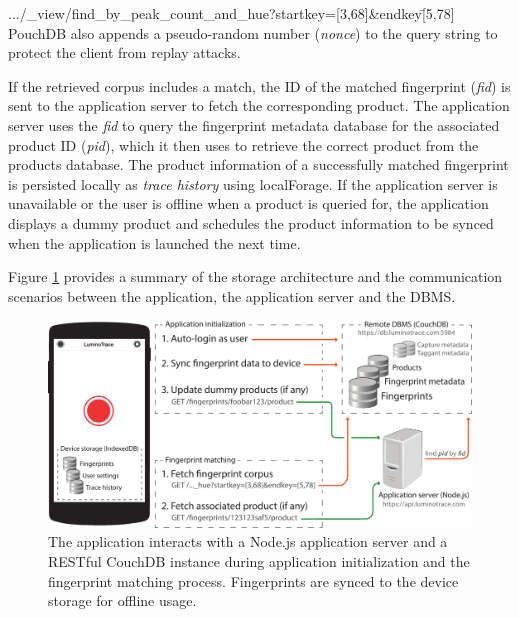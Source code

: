 \documentclass[thesis.tex]{subfiles}
\begin{document}
\colorbox{gray!10} {\quad \small .../\_view/find\_by\_peak\_count\_and\_hue?startkey=[3,68]\&endkey\=[5,78] \quad} \\


\noindent PouchDB also appends a pseudo-random number (\emph{nonce}) to the query string to protect the client from replay attacks.

If the retrieved corpus includes a match, the ID of the matched fingerprint (\emph{fid}) is sent to the application server to fetch the corresponding product. The application server uses the \emph{fid} to query the fingerprint metadata database for the associated product ID (\emph{pid}), which it then uses to retrieve the correct product from the products database. The product information of a successfully matched fingerprint is persisted locally as \emph{trace history} using localForage. If the application server is unavailable or the user is offline when a product is queried for, the application displays a dummy product and schedules the product information to be synced when the application is launched the next time.

Figure \ref{figure:application-database-flow} provides a summary of the storage architecture and the communication scenarios between the application, the application server and the DBMS.

\enlargethispage{10\baselineskip}

\begin{figure}[h]
\centering \includegraphics[width=\textwidth,height=\textheight,keepaspectratio=true]{images/design_implementation/application_database_flow}
\caption{The application interacts with a Node.js application server and a RESTful CouchDB instance during application initialization and the fingerprint matching process. Fingerprints are synced to the device storage for offline usage.\label{figure:application-database-flow}}
\end{figure}
\end{document}
